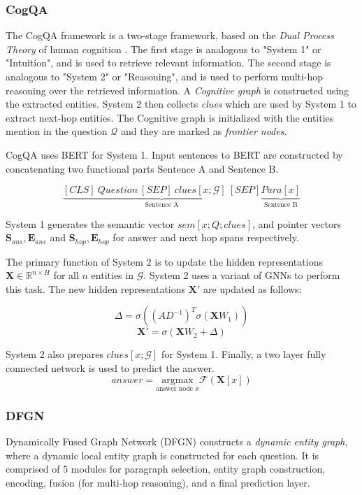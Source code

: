 \documentclass[sigplan,screen]{acmart}
\begin{document}
\subsubsection{CogQA}
The CogQA framework \cite{RN118} is a two-stage framework, based on the \emph{Dual Process Theory} of human cognition \cite{RN137}.
The first stage is analogous to "System 1" or "Intuition", and is used to retrieve relevant information. The second stage is analogous to
"System 2" or "Reasoning", and is used to perform multi-hop reasoning over the retrieved information. A \emph{Cognitive graph} is constructed
using the extracted entities. System 2 then collects \emph{clues} which are used by System 1 to extract next-hop entities.
The Cognitive graph is initialized with the entities mention in the question $\mathcal{Q}$ and they are marked as \emph{frontier nodes}.

CogQA uses BERT \cite{RN153} for System 1. Input sentences to BERT are constructed by concatenating two functional parts 
$\text{Sentence A}$ and $\text{Sentence B}$.

$$
\underbrace{{[CLS]\: Question \: [SEP]\: clues[x; \mathcal{G}]\: [SEP]}}_{\text{Sentence A}} \underbrace{{Para[x]}}_{\text{Sentence B}}
$$

System 1 generates the semantic vector $sem[x; Q; clues]$, and pointer vectors 
$\boldsymbol{S}_{ans} , \boldsymbol{E}_{ans} $ and $\boldsymbol{S}_{hop} , \boldsymbol{E}_{hop} $ for answer and next hop spans respectively.

The primary function of System 2 is to update the hidden representations $\boldsymbol{X} \in \mathbb{R}^{n \times H}$ for all $n$ entities 
in $\mathcal{G}$. System 2 uses a variant of GNNs \cite{RN2} to perform this task. The new hidden representations $\boldsymbol{X'}$ are updated 
as follows:

$$
\Delta = \sigma((AD^{-1})^T \sigma (\boldsymbol{X}W_1))
$$
$$
\boldsymbol{X'} = \sigma(\boldsymbol{X}W_2 + \Delta)
$$

System 2 also prepares $clues[x; \mathcal{G}]$ for System 1. Finally, a two layer fully connected network is used to predict the answer.
$$
answer = \underset{\text{answer node }x}{\mathrm{argmax}}  \mathcal{F}(\boldsymbol{X}[x])
$$

\subsubsection{DFGN}
Dynamically Fused Graph Network (DFGN) \cite{RN122} constructs a \emph{dynamic entity graph}, where a dynamic local entity graph is 
constructed for each question. It is comprised of 5 modules for paragraph selection, entity graph construction, encoding, fusion 
(for multi-hop reasoning), and a final prediction layer.
\end{document}
